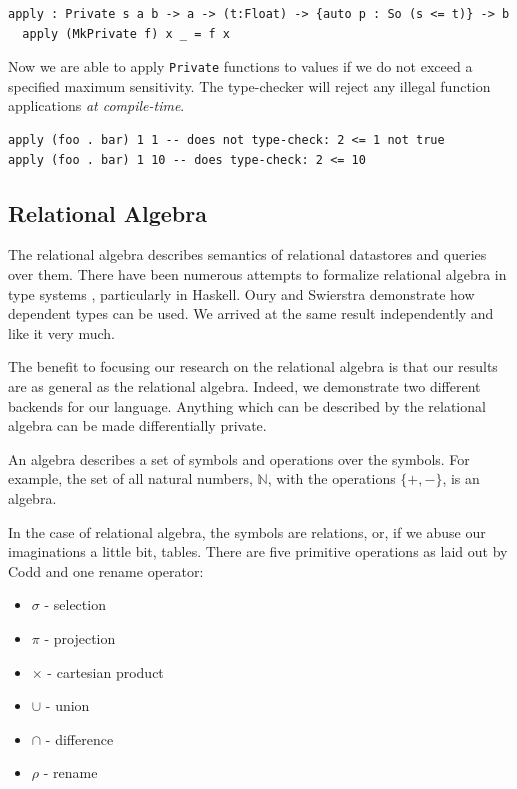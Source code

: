 \documentclass[12pt]{article}
\begin{document}
\begin{lstlisting}[caption="Private function application"]
  apply : Private s a b -> a -> (t:Float) -> {auto p : So (s <= t)} -> b
  apply (MkPrivate f) x _ = f x
\end{lstlisting}

Now we are able to apply \texttt{Private} functions to values if we do not exceed a specified maximum sensitivity.
The type-checker will reject any illegal function applications \textit{at compile-time}.

\begin{lstlisting}
apply (foo . bar) 1 1 -- does not type-check: 2 <= 1 not true
apply (foo . bar) 1 10 -- does type-check: 2 <= 10
\end{lstlisting}

\subsection{Relational Algebra}

The relational algebra describes semantics of relational datastores and queries over them.
There have been numerous attempts to formalize relational algebra in type systems %
, particularly in Haskell.
Oury and Swierstra demonstrate how dependent types can be used\cite{OurySwierstra08PowerOfPi}.
We arrived at the same result independently and like it very much.

The benefit to focusing our research on the relational algebra is that our results are as general as the relational algebra.
Indeed, we demonstrate two different backends for our language.
Anything which can be described by the relational algebra can be made differentially private. %

An algebra describes a set of symbols and operations over the symbols.
For example, the set of all natural numbers, $\mathbb{N}$, with the operations $\{+,-\}$, is an algebra.

In the case of relational algebra, the symbols are relations, or, if we abuse our imaginations a little bit, tables.
There are five primitive operations as laid out by Codd\cite{codd70} and one rename operator:

\begin{itemize}
  \item $\sigma$ - selection
  \item $\pi$    - projection
  \item $\times$ - cartesian product
  \item $\cup$   - union
  \item $\cap$   - difference
  \item $\rho$   - rename
\end{itemize}
\end{document}
